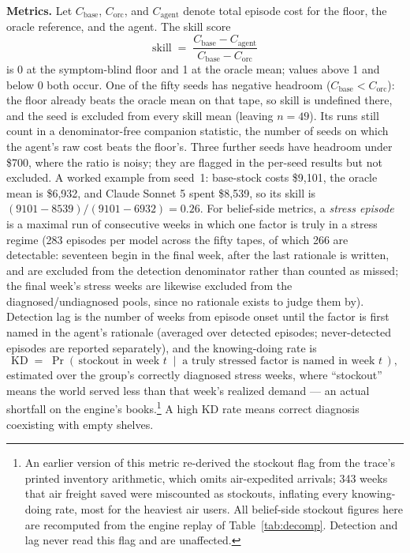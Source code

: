 \documentclass{article}
\begin{document}
\textbf{Metrics.} Let $C_{\mathrm{base}}$, $C_{\mathrm{orc}}$, and
$C_{\mathrm{agent}}$ denote total episode cost for the floor, the oracle
reference, and the agent. The skill score
\begin{equation}
\mathrm{skill} \;=\; \frac{C_{\mathrm{base}} - C_{\mathrm{agent}}}{C_{\mathrm{base}} - C_{\mathrm{orc}}}
\end{equation}
is 0 at the symptom-blind floor and 1 at the oracle mean; values above 1 and
below 0 both occur. One of the fifty seeds has negative headroom
($C_{\mathrm{base}} < C_{\mathrm{orc}}$): the floor already beats the oracle
mean on that tape, so skill is undefined there, and the seed is excluded
from every skill mean (leaving $n = 49$). Its runs still count in a
denominator-free companion statistic, the number of seeds on which the
agent's raw cost beats the floor's. Three further seeds have headroom under
\$700, where the ratio is noisy; they are flagged in the per-seed results
but not excluded. A worked example from seed~1: base-stock costs \$9{,}101,
the oracle mean is \$6{,}932, and Claude Sonnet 5 spent \$8{,}539, so its
skill is $(9101-8539)/(9101-6932)=0.26$. For belief-side metrics, a
\emph{stress episode} is a maximal run of consecutive weeks in which one
factor is truly in a stress regime (283 episodes per model across the
fifty tapes, of which 266 are detectable: seventeen begin in the final
week, after the last rationale is written, and are excluded from the
detection denominator rather than counted as missed; the final week's
stress weeks are likewise excluded from the diagnosed/undiagnosed pools,
since no rationale exists to judge them by).
Detection lag is the number of weeks from episode onset until the factor is
first named in the agent's rationale (averaged over detected episodes;
never-detected episodes are reported separately), and the knowing-doing rate
is
\begin{equation}
\mathrm{KD} \;=\; \Pr\!\left(\,\text{stockout in week } t \;\middle|\; \text{a truly stressed factor is named in week } t\,\right),
\end{equation}
estimated over the group's correctly diagnosed stress weeks, where
``stockout'' means the world served less than that week's realized demand
--- an actual shortfall on the engine's books.\footnote{An earlier version
of this metric re-derived the stockout flag from the trace's printed
inventory arithmetic, which omits air-expedited arrivals; 343 weeks that
air freight saved were miscounted as stockouts, inflating every
knowing-doing rate, most for the heaviest air users. All belief-side
stockout figures here are recomputed from the engine replay of
Table~\ref{tab:decomp}. Detection and lag never read this flag and are
unaffected.} A high KD rate means correct diagnosis coexisting with empty
shelves.
\end{document}
